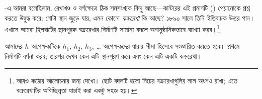 \documentclass[../../../include/open-logic-section]{subfiles}
\begin{document}


-এ আমরা বলেছিলাম,
রেখাখণ্ড ও বর্গক্ষেত্রে ঠিক সমসংখ্যক বিন্দু আছে—কান্টরের
এই প্রমাণটি ()
পেয়ানোকে প্রশ্ন করতে উদ্বুদ্ধ করে: গোটা স্থান জুড়ে যায়,
এমন কোনো \emph{বক্ররেখা} কি আছে? ১৮৯০ সালে তিনি
ইতিবাচক উত্তর পান। এখানে আমরা হিলবার্টের
স্থানপূরক বক্ররেখার নির্মাণটি সামান্য বদলে
অনানুষ্ঠানিকভাবে ব্যাখ্যা করব।\footnote{আরও কঠোর
আলোচনার জন্য \cite{Rose2010} দেখো। ছোট বদলটি
হলো নিচের বক্ররেখাগুলির লাল অংশও রাখা; এতে
বক্ররেখাটির অবিচ্ছিন্নতা যাচাই করা একটু সহজ হয়।}

আমাদের $h$ অপেক্ষকটিকে $h_1$, $h_2$, $h_3$, \dots\@
অপেক্ষকদের ধারার সীমা হিসেবে সংজ্ঞায়িত করতে হবে।
প্রথমে নির্মাণটি বর্ণনা করব; তারপর দেখব কেন এটি
স্থানপূরণ করে এবং কেন এটি একটি বক্ররেখা।
\end{document}
